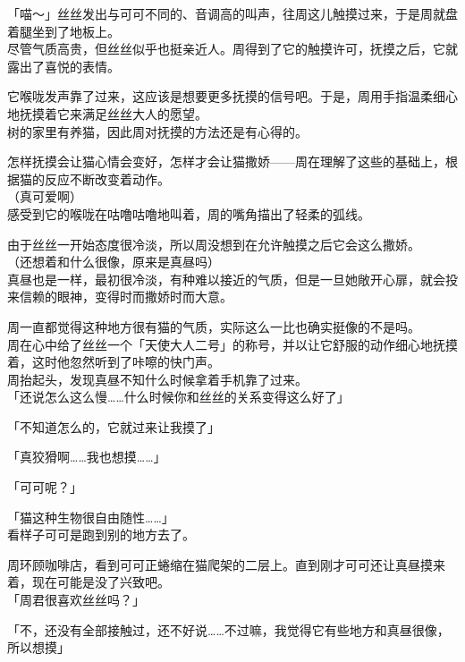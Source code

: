 「喵～」丝丝发出与可可不同的、音调高的叫声，往周这儿触摸过来，于是周就盘着腿坐到了地板上。\\

尽管气质高贵，但丝丝似乎也挺亲近人。周得到了它的触摸许可，抚摸之后，它就露出了喜悦的表情。

它喉咙发声靠了过来，这应该是想要更多抚摸的信号吧。于是，周用手指温柔细心地抚摸着它来满足丝丝大人的愿望。\\

树的家里有养猫，因此周对抚摸的方法还是有心得的。

怎样抚摸会让猫心情会变好，怎样才会让猫撒娇——周在理解了这些的基础上，根据猫的反应不断改变着动作。\\

（真可爱啊）\\

感受到它的喉咙在咕噜咕噜地叫着，周的嘴角描出了轻柔的弧线。

由于丝丝一开始态度很冷淡，所以周没想到在允许触摸之后它会这么撒娇。\\

（还想着和什么很像，原来是真昼吗）\\

真昼也是一样，最初很冷淡，有种难以接近的气质，但是一旦她敞开心扉，就会投来信赖的眼神，变得时而撒娇时而大意。

周一直都觉得这种地方很有猫的气质，实际这么一比也确实挺像的不是吗。\\

周在心中给了丝丝一个「天使大人二号」的称号，并以让它舒服的动作细心地抚摸着，这时他忽然听到了咔嚓的快门声。\\

周抬起头，发现真昼不知什么时候拿着手机靠了过来。\\

「还说怎么这么慢……什么时候你和丝丝的关系变得这么好了」

「不知道怎么的，它就过来让我摸了」

「真狡猾啊……我也想摸……」

「可可呢？」

「猫这种生物很自由随性……」\\

看样子可可是跑到别的地方去了。

周环顾咖啡店，看到可可正蜷缩在猫爬架的二层上。直到刚才可可还让真昼摸来着，现在可能是没了兴致吧。\\

「周君很喜欢丝丝吗？」

「不，还没有全部接触过，还不好说……不过嘛，我觉得它有些地方和真昼很像，所以想摸」

